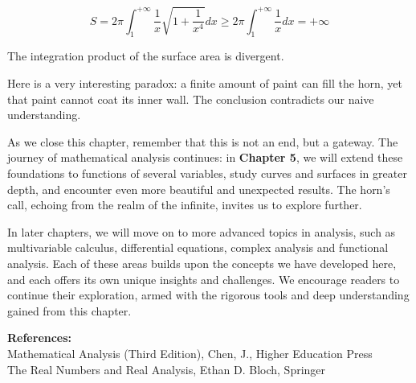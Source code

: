 \[
S = 2\pi \int_{1}^{+\infty} \frac{1}{x} \sqrt{1+\frac{1}{x^4}} dx \geq 2\pi \int_{1}^{+\infty} \frac{1}{x} dx = +\infty
\]

The integration product of the surface area is divergent.

Here is a very interesting paradox: a finite amount of paint can fill the horn, yet that paint cannot coat its inner wall. The conclusion contradicts our naive understanding.

As we close this chapter, remember that this is not an end, but a gateway. The journey of mathematical analysis continues: in \textbf{Chapter 5}, we will extend these foundations to functions of several variables, study curves and surfaces in greater depth, and encounter even more beautiful and unexpected results. The horn's call, echoing from the realm of the infinite, invites us to explore further.

In later chapters, we will move on to more advanced topics in analysis, such as multivariable calculus, differential equations, complex analysis and functional analysis. Each of these areas builds upon the concepts we have developed here, and each offers its own unique insights and challenges. We encourage readers to continue their exploration, armed with the rigorous tools and deep understanding gained from this chapter.


\vspace{1cm}
\noindent
\textbf{References:} \\
Mathematical Analysis (Third Edition), Chen, J., Higher Education Press \\
The Real Numbers and Real Analysis, Ethan D. Bloch, Springer

\cleardoublepage